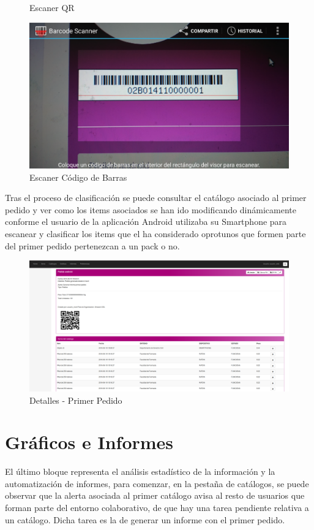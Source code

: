 \documentclass[a4paper,11pt]{book}
\begin{document}
\begin{figure}[H]
  \caption{Escaner QR\cite{propio}}
\endminipage\hfill
{}
  \includegraphics[width=\linewidth]{imagenes/pruebas/movil/movil16.png}
  \caption{Escaner Código de Barras\cite{propio}}
\endminipage\hfill
\end{figure}

Tras el proceso de clasificación se puede consultar el catálogo asociado al primer pedido y ver como los items asociados se han ido modificando dinámicamente conforme el usuario de la aplicación Android utilizaba su Smartphone para escanear y clasificar los items que el ha considerado oprotunos que formen parte del primer pedido pertenezcan a un pack o no. 

\begin{figure}[H] 
\centering 
\includegraphics[scale=0.25]{imagenes/pruebas/pedido.png}
\caption{ Detalles - Primer Pedido\cite{propio}}
\end{figure}

\section{ Gráficos e Informes}

El último bloque representa el análisis estadístico de la información y la automatización de informes, para comenzar, en la pestaña de catálogos, se puede observar que la alerta asociada al primer catálogo avisa al resto de usuarios que forman parte del entorno colaborativo, de que hay una tarea pendiente relativa a un catálogo. Dicha tarea es la de generar un informe con el primer pedido.
\end{document}
